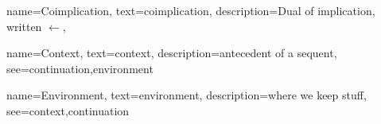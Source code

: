 
{
  name={Coimplication},
  text={coimplication},
  description={Dual of implication, written \(\leftarrow\)},
}

{
  name={Context},
  text={context},
  description={antecedent of a sequent},
  see={continuation,environment}
}

{
  name={Environment},
  text={environment},
  description={where we keep stuff},
  see={context,continuation}
}
